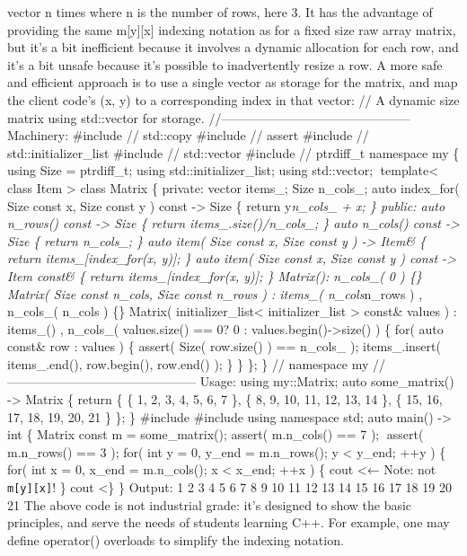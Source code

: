 vector n times where n is the number of rows, here 3. It has the
advantage of providing the same m{[}y{]}{[}x{]} indexing notation as for
a fixed size raw array matrix, but it's a bit inefficient because it
involves a dynamic allocation for each row, and it's a bit unsafe
because it's possible to inadvertently resize a row. A more safe and
efficient approach is to use a single vector as storage for the matrix,
and map the client code's (x, y) to a corresponding index in that
vector: // A dynamic size matrix using std::vector for storage.
//--------------------------------------------- Machinery: \#include //
std::copy \#include // assert \#include // std::initializer\_list
\#include // std::vector \#include // ptrdiff\_t namespace my \{ using
Size = ptrdiff\_t; using std::initializer\_list; using std::vector;
template\textless{} class Item \textgreater{} class Matrix \{ private:
vector items\_; Size n\_cols\_; auto index\_for( Size const x, Size
const y ) const -\textgreater{} Size \{ return y\emph{n\_cols\_ + x; \}
public: auto n\_rows() const -\textgreater{} Size \{ return
items\_.size()/n\_cols\_; \} auto n\_cols() const -\textgreater{} Size
\{ return n\_cols\_; \} auto item( Size const x, Size const y )
-\textgreater{} Item\& \{ return items\_{[}index\_for(x, y){]}; \} auto
item( Size const x, Size const y ) const -\textgreater{} Item const\& \{
return items\_{[}index\_for(x, y){]}; \} Matrix(): n\_cols\_( 0 ) \{\}
Matrix( Size const n\_cols, Size const n\_rows ) : items\_(
n\_cols}n\_rows ) , n\_cols\_( n\_cols ) \{\} Matrix(
initializer\_list\textless{} initializer\_list \textgreater{} const\&
values ) : items\_() , n\_cols\_( values.size() == 0? 0 :
values.begin()-\textgreater size() ) \{ for( auto const\& row : values )
\{ assert( Size( row.size() ) == n\_cols\_ ); items\_.insert(
items\_.end(), row.begin(), row.end() ); \} \} \}; \} // namespace my
//--------------------------------------------- Usage: using my::Matrix;
auto some\_matrix() -\textgreater{} Matrix \{ return \{ \{ 1, 2, 3, 4,
5, 6, 7 \}, \{ 8, 9, 10, 11, 12, 13, 14 \}, \{ 15, 16, 17, 18, 19, 20,
21 \} \}; \} \#include \#include using namespace std; auto main()
-\textgreater{} int \{ Matrix const m = some\_matrix(); assert(
m.n\_cols() == 7 ); assert( m.n\_rows() == 3 ); for( int y = 0, y\_end
= m.n\_rows(); y \textless{} y\_end; ++y ) \{ for( int x = 0, x\_end =
m.n\_cols(); x \textless{} x\_end; ++x ) \{ cout \textless← Note: not
\passthrough{\lstinline!m[y][x]!}! \} cout \textless\} \} Output: 1 2 3
4 5 6 7 8 9 10 11 12 13 14 15 16 17 18 19 20 21 The above code is not
industrial grade: it's designed to show the basic principles, and serve
the needs of students learning C++. For example, one may define
operator() overloads to simplify the indexing notation.
